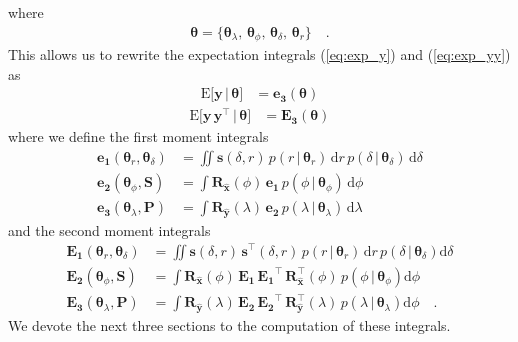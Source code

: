 \documentclass[modern]{aastex62}
\begin{document}
%
where
%
\begin{align}
    \pmb{\theta} = \big\{
    \pmb{\theta}_{\lambda}, \,
    \pmb{\theta}_{\phi}, \,
    \pmb{\theta}_{\delta}, \,
    \pmb{\theta}_{r} \big\}
    \quad.
\end{align}
%
This allows us to rewrite the expectation integrals (\ref{eq:exp_y})
and (\ref{eq:exp_yy}) as
%
\begin{align}
    \label{eq:exp_y_sep}
    \mathrm{E} \Big[ \mathbf{y} \, \Big| \, \pmb{\theta} \Big]
     & =
    \mathbf{e_3}(\pmb{\theta})
\end{align}
\begin{align}
    \label{eq:exp_yy_sep}
    \mathrm{E} \Big[ \mathbf{y} \, \mathbf{y}^\top \, \Big| \, \pmb{\theta} \Big]
     & =
    \mathbf{E_3}(\pmb{\theta})
\end{align}
%
where we define the first moment integrals
%
\begin{align}
    \mathbf{e_1}(\pmb{\theta}_r, \pmb{\theta}_\delta)
     & =
    \iint
    \mathbf{s}(\delta, r) \,
    p(r \, \big| \, \pmb{\theta}_{r}) \,
    \mathrm{d}r \,
    p(\delta \, \big| \, \pmb{\theta}_{\delta}) \,
    \mathrm{d}\delta
    \\[1em]
    \mathbf{e_2}(\pmb{\theta}_\phi, \mathbf{S})
     & =
    \int
    \mathbf{R}_{\hat{\mathbf{x}}}(\phi) \,
    \mathbf{e_1} \,
    p(\phi \, \big| \, \pmb{\theta}_{\phi}) \,
    \mathrm{d}\phi
    \\[1em]
    \mathbf{e_3}(\pmb{\theta}_\lambda, \mathbf{P})
     & =
    \int
    \mathbf{R}_{\hat{\mathbf{y}}}(\lambda) \,
    \mathbf{e_2} \,
    p(\lambda \, \big| \, \pmb{\theta}_{\lambda}) \,
    \mathrm{d}\lambda
\end{align}
%
and the second moment integrals
%
\begin{align}
    \mathbf{E_1}(\pmb{\theta}_r, \pmb{\theta}_\delta)
     & =
    \iint
    \mathbf{s}(\delta, r) \, \mathbf{s}^\top(\delta, r) \,
    p(r \, \big| \, \pmb{\theta}_{r}) \,
    \mathrm{d}r \,
    p(\delta \, \big| \, \pmb{\theta}_{\delta})
    \mathrm{d}\delta
    \\[1em]
    \mathbf{E_2}(\pmb{\theta}_\phi, \mathbf{S})
     & =
    \int
    \mathbf{R}_{\hat{\mathbf{x}}}(\phi) \,
    \mathbf{E_1} \,
    \mathbf{E_1}^\top \,
    \mathbf{R}_{\hat{\mathbf{x}}}^\top(\phi) \,
    p(\phi \, \big| \, \pmb{\theta}_{\phi})
    \mathrm{d}\phi
    \\[1em]
    \mathbf{E_3}(\pmb{\theta}_\lambda, \mathbf{P})
     & =
    \int
    \mathbf{R}_{\hat{\mathbf{y}}}(\lambda) \,
    \mathbf{E_2} \,
    \mathbf{E_2}^\top \,
    \mathbf{R}_{\hat{\mathbf{y}}}^\top(\lambda) \,
    p(\lambda \, \big| \, \pmb{\theta}_{\lambda})
    \mathrm{d}\phi
    \quad.
\end{align}
%
We devote the next three sections to the computation of these
integrals.
\end{document}
